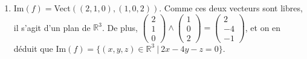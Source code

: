 \documentclass[a4paper, 11pt]{article}
\theoremstyle{plain}
\newcommand{\R}{\mathbb{R}}
\begin{document}
\begin{enumerate}
\item 
Im$(f) =$Vect$( (2,1,0) , (1,0,2))$. Comme ces deux vecteurs sont libres, il s'agit d'un plan de 
$\R^3$. 
De plus, 
$\begin{pmatrix}
2\\1\\0
\end{pmatrix}
\wedge 
\begin{pmatrix}
1\\0\\2
\end{pmatrix}
=\begin{pmatrix}
2\\-4\\-1
\end{pmatrix}$, et on en déduit que 
Im$(f) = \{ (x,y,z) \in \R^3 \ \big| \ 2x-4y-z =0 \}$.


\end{enumerate}
\end{document}
